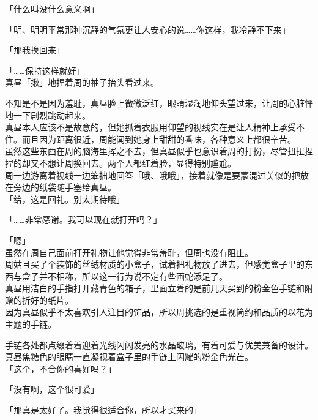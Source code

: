 「什么叫没什么意义啊」

「明、明明平常那种沉静的气氛更让人安心的说……你这样，我冷静不下来」

「那我换回来」

「……保持这样就好」\\

真昼「揪」地捏着周的袖子抬头看过来。

不知是不是因为羞耻，真昼脸上微微泛红，眼睛湿润地仰头望过来，让周的心脏怦地一下剧烈跳动起来。\\

真昼本人应该不是故意的，但她抓着衣服用仰望的视线实在是让人精神上承受不住。而且因为距离很近，周能闻到她身上甜甜的香味，各种意义上都很辛苦。\\

虽然这些东西在周的脑海里挥之不去，但真昼似乎也意识着周的打扮，尽管扭扭捏捏的却又不想让周换回去。两个人都红着脸，显得特别尴尬。\\

周一边游离着视线一边笨拙地回答「哦、哦哦」，接着就像是要蒙混过关似的把放在旁边的纸袋随手塞给真昼。\\

「给，这是回礼。别太期待哦」

「……非常感谢。我可以现在就打开吗？」

「嗯」\\

虽然在周自己面前打开礼物让他觉得非常羞耻，但周也没有阻止。\\

周姑且买了个装饰的丝绒材质的小盒子，试着把礼物放了进去，但感觉盒子里的东西与盒子并不相称，所以这一行为说不定有些画蛇添足了。\\

真昼用洁白的手指打开藏青色的箱子，里面立着的是前几天买到的粉金色手链和附赠的折好的纸片。\\

因为真昼似乎不太喜欢引人注目的饰品，所以周挑选的是重视简约和品质的以花为主题的手链。

手链各处都点缀着着迎着光线闪闪发亮的水晶玻璃，有着可爱与优美兼备的设计。\\

真昼焦糖色的眼睛一直凝视着盒子里的手链上闪耀的粉金色光芒。\\

「这个，不合你的喜好吗？」

「没有啊，这个很可爱」

「那真是太好了。我觉得很适合你，所以才买来的」

